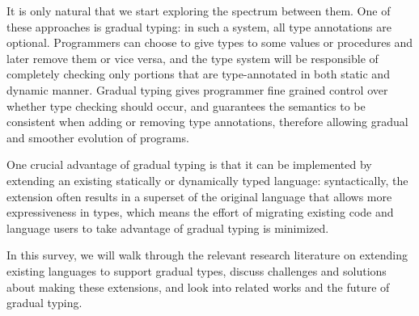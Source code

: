 It is only natural that we start exploring the spectrum between them.
One of these approaches is gradual typing: in such a system,
all type annotations are optional.
Programmers can choose to give types to some values or procedures and later remove them or vice versa, and the type system will be responsible of completely checking only portions
that are type-annotated in both static and dynamic manner.
Gradual typing gives programmer fine grained control over whether type checking should occur,
and guarantees the semantics to be consistent when adding or removing type annotations,
therefore allowing gradual and smoother evolution of programs.

One crucial advantage of gradual typing is that it can be implemented
by extending an existing statically or dynamically typed language:
syntactically, the extension often results in a superset of the original
language that allows more expressiveness in types, which means
the effort of migrating existing code and language users
to take advantage of gradual typing is minimized.

In this survey, we will walk through the relevant research literature on extending
existing languages to support gradual types,
discuss challenges and solutions about making these extensions,
and look into related works and the future of gradual typing.